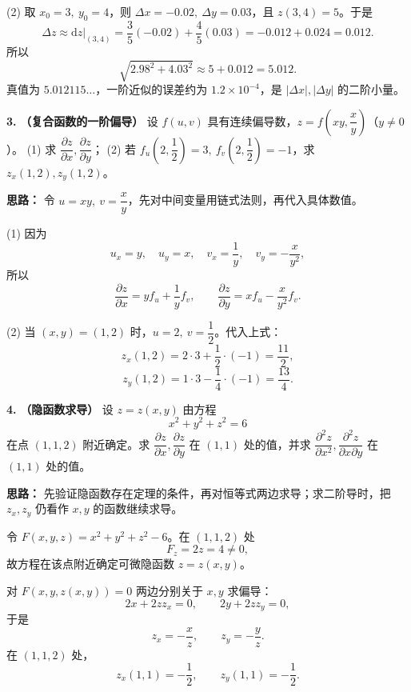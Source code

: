 (2) 取 \(x_0=3,\ y_0=4\)，则 \(\varDelta x=-0.02,\ \varDelta y=0.03\)，且 \(z(3,4)=5\)。于是
\[
\varDelta z\approx \mathrm dz\big|_{(3,4)}
=\frac35(-0.02)+\frac45(0.03)
=-0.012+0.024=0.012.
\]
所以
\[
\sqrt{2.98^2+4.03^2}\approx 5+0.012=5.012.
\]
真值为 \(5.012115\ldots\)，一阶近似的误差约为 \(1.2\times10^{-4}\)，是 \(|\varDelta x|,|\varDelta y|\) 的二阶小量。

\else \answerarea[8] \fi%

\textbf{3.} \textbf{（复合函数的一阶偏导）} 设 \(f(u,v)\) 具有连续偏导数，\(z=f\left(xy,\dfrac{x}{y}\right)\)（\(y\neq0\)）。
(1) 求 \(\dfrac{\partial z}{\partial x},\dfrac{\partial z}{\partial y}\)；
(2) 若 \(f_u\left(2,\dfrac12\right)=3,\ f_v\left(2,\dfrac12\right)=-1\)，求 \(z_x(1,2),z_y(1,2)\)。

\ifshowsolutions%
\textbf{思路：} 令 \(u=xy,\ v=\dfrac{x}{y}\)，先对中间变量用链式法则，再代入具体数值。

(1) 因为
\[
u_x=y,\quad u_y=x,\quad v_x=\frac1y,\quad v_y=-\frac{x}{y^2},
\]
所以
\[
\frac{\partial z}{\partial x}=y f_u+\frac1y f_v,
\qquad
\frac{\partial z}{\partial y}=x f_u-\frac{x}{y^2}f_v.
\]

(2) 当 \((x,y)=(1,2)\) 时，\(u=2,\ v=\dfrac12\)。代入上式：
\[
z_x(1,2)=2\cdot3+\frac12\cdot(-1)=\frac{11}{2},
\]
\[
z_y(1,2)=1\cdot3-\frac{1}{4}\cdot(-1)=\frac{13}{4}.
\]

\else \answerarea[8] \fi%

\textbf{4.} \textbf{（隐函数求导）} 设 \(z=z(x,y)\) 由方程
\[
x^2+y^2+z^2=6
\]
在点 \((1,1,2)\) 附近确定。求 \(\dfrac{\partial z}{\partial x},\dfrac{\partial z}{\partial y}\) 在 \((1,1)\) 处的值，并求 \(\dfrac{\partial^2 z}{\partial x^2},\dfrac{\partial^2 z}{\partial x\partial y}\) 在 \((1,1)\) 处的值。

\ifshowsolutions%
\textbf{思路：} 先验证隐函数存在定理的条件，再对恒等式两边求导；求二阶导时，把 \(z_x,z_y\) 仍看作 \(x,y\) 的函数继续求导。

令 \(F(x,y,z)=x^2+y^2+z^2-6\)。在 \((1,1,2)\) 处
\[
F_z=2z=4\neq0,
\]
故方程在该点附近确定可微隐函数 \(z=z(x,y)\)。

对 \(F(x,y,z(x,y))=0\) 两边分别关于 \(x,y\) 求偏导：
\[
2x+2zz_x=0,\qquad 2y+2zz_y=0,
\]
于是
\[
z_x=-\frac{x}{z},\qquad z_y=-\frac{y}{z}.
\]
在 \((1,1,2)\) 处，
\[
z_x(1,1)=-\frac12,\qquad z_y(1,1)=-\frac12.
\]

